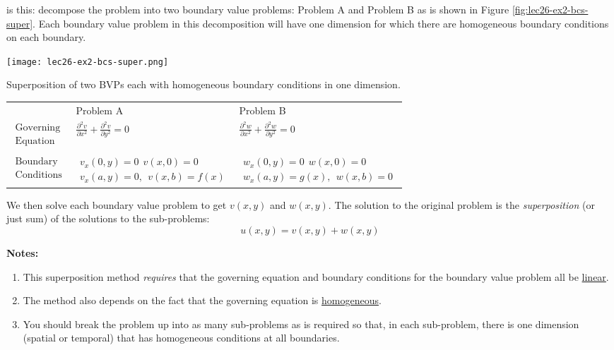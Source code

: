 is this: decompose the problem into two boundary value problems: Problem A and Problem B as is shown in Figure \ref{fig:lec26-ex2-bcs-super}.  Each boundary value problem in this decomposition will have one dimension for which there are homogeneous boundary conditions on each boundary.
\begin{marginfigure}
\texttt{[image: lec26-ex2-bcs-super.png]}
\caption{Superposition of two BVPs each with homogeneous boundary conditions in one dimension.}
\label{fig:lec26-ex2-bcs-super}
\end{marginfigure}
\begin{table}
\begin{tabular}{l l | l}
 & Problem A & Problem B \\ 
 $\substack{\text{Governing} \\ \text{Equation}}$ & $\frac{\partial^2 v}{\partial x^2} + \frac{\partial^2 v}{\partial y^2}=0$ & $\frac{\partial^2 w}{\partial x^2} + \frac{\partial^2 w}{\partial y^2}=0$\\
 & & \\
 $\substack{\text{Boundary}\\\text{Conditions}}$ & $\substack{v_x(0,y) = 0 \ \ v(x,0) = 0\\ v_x(a,y) = 0, \ \ v(x,b)=f(x)}$ & $\substack{w_x(0,y) = 0 \ \ w(x,0) = 0 \\ w_x(a,y) = g(x), \ \ w(x,b) = 0}$
\end{tabular}
\end{table}

\vspace{0.25cm}


\noindent We then solve each boundary value problem to get $v(x,y)$ and $w(x,y)$.  The solution to the original problem is the \emph{superposition} (or just sum) of the solutions to the sub-problems:
\begin{equation*}
u(x,y) = v(x,y) + w(x,y)
\end{equation*}

\vspace{0.25cm}

\noindent\textbf{Notes:}

\begin{enumerate}
\item This superposition method \emph{requires} that the governing equation and boundary conditions for the boundary value problem all be \underline{linear}.  
\item The method also depends on the fact that the governing equation is \underline{homogeneous}.
\item You should break the problem up into as many sub-problems as is required so that, in each sub-problem, there is one dimension (spatial or temporal) that has homogeneous conditions at all boundaries.
\end{enumerate}
